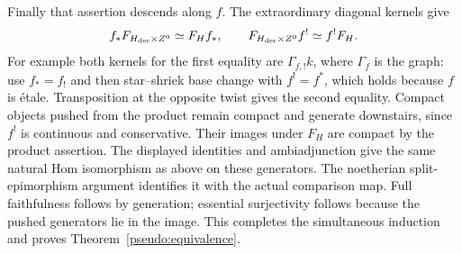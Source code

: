 Finally that assertion descends along $f$.  The extraordinary diagonal
kernels give
\[
 f_*F_{H_{\rm der}\times Z^0}\simeq F_Hf_* ,\qquad
 F_{H_{\rm der}\times Z^0}f^!\simeq f^!F_H.
\]
For example both kernels for the first equality are
$\Gamma_{f,!}k$, where $\Gamma_f$ is the graph: use $f_*=f_!$ and then
star--shriek base change with $f^!=f^*$, which holds because $f$ is
\'{e}tale.  Transposition at the opposite twist gives the second equality.
Compact objects pushed from the product remain compact and generate
downstairs, since $f^!$ is continuous and conservative.  Their images
under $F_H$ are compact by the product assertion.  The displayed identities
and ambiadjunction give the same natural Hom isomorphism as above on these
generators.  The noetherian split-epimorphism argument identifies it with
the actual comparison map.  Full faithfulness follows by generation;
essential surjectivity follows because the pushed generators lie in the
image.  This completes the simultaneous induction and proves
Theorem~\ref{pseudo:equivalence}.
